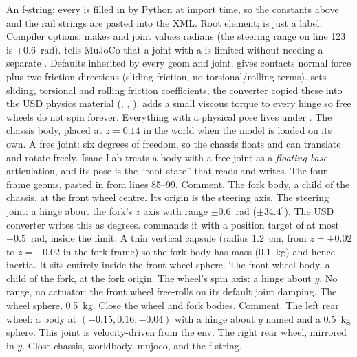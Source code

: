
\begin{explain}
 An f-string: every  is filled in by Python at import
  time, so the constants above and the rail strings are pasted into the XML.
 Root element;  is just a label.
 Compiler options.  makes  and joint
   values radians (the steering range on line 123 is
  $\pm0.6$~rad).  tells MuJoCo that a joint with a
   is limited without needing a separate .
 Defaults inherited by every geom and joint. 
  gives contacts normal force plus two friction directions (sliding friction,
  no torsional/rolling terms).  sets
  sliding, torsional and rolling friction coefficients; the converter copied
  these into the USD physics material (,
  , ).  adds a small viscous torque to every
  hinge so free wheels do not spin forever.
 Everything with a physical pose lives under .
 The chassis body, placed at $z=0.14$ in the world when the model is
  loaded on its own.
 A free joint: six degrees of freedom, so the chassis floats and can
  translate and rotate freely. Isaac Lab treats a body with a free joint as
  a \emph{floating-base} articulation, and its pose is the ``root state''
  that  reads and writes.
 The four frame geoms, pasted in from lines 85--99.
 Comment.
 The fork body, a child of the chassis, at the front wheel centre.
  Its origin is the steering axis.
 The steering joint: a hinge about the fork's $z$ axis with range
  $\pm0.6$~rad ($\pm34.4^\circ$). The USD converter writes this as
   degrees. 
  commands it with a position target of at most $\pm0.5$~rad, inside the
  limit.
 A thin vertical capsule (radius 1.2~cm, from $z=+0.02$ to
  $z=-0.02$ in the fork frame) so the fork body has mass (0.1~kg) and hence
  inertia. It sits entirely inside the front wheel sphere.
 The front wheel body, a child of the fork, at the fork origin.
 The wheel's spin axis: a hinge about $y$. No range, no actuator:
  the front wheel free-rolls on its default joint damping.
 The wheel sphere, 0.5~kg.
 Close the wheel and fork bodies.
 Comment.
 The left rear wheel: a body at $(-0.15, 0.16, -0.04)$ with a
  hinge about $y$ named  and a 0.5~kg sphere. This joint is
  velocity-driven from the env.
 The right rear wheel, mirrored in $y$.
 Close chassis, worldbody, mujoco, and the f-string.
\end{explain}

